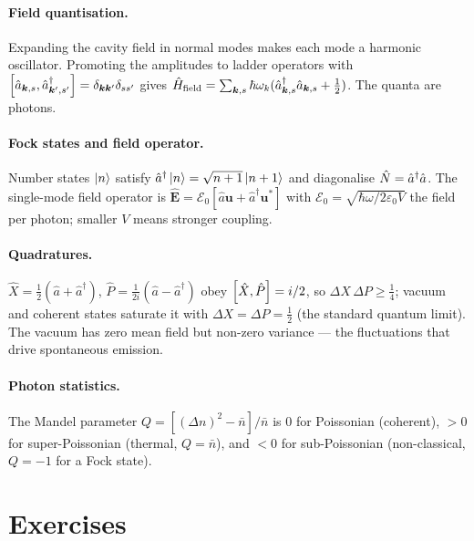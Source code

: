 \clearpage
\begin{chaptersummary}

\paragraph{Field quantisation.}
Expanding the cavity field in normal modes makes each mode a
harmonic oscillator. Promoting the amplitudes to ladder operators
with $\comm{\hat a_{\bm k,s}}{\hat a_{\bm k',s'}^\dagger}=\delta_{\bm k\bm k'}\delta_{ss'}$
gives $\hat{H}_{\rm field}=\sum_{\bm k,s}\hbar\omega_k(\hat a_{\bm k,s}^\dagger\hat a_{\bm k,s}+\tfrac12)$.
The quanta are photons.

\paragraph{Fock states and field operator.}
Number states $\ket n$ satisfy $\hat a^\dagger\ket n=\sqrt{n+1}\ket{n+1}$
and diagonalise $\hat{N}=\hat a^\dagger\hat a$. The single-mode field
operator is $\hat{\bm E}=\mathcal E_0[\hat a\bm u+\hat a^\dagger\bm u^*]$
with $\mathcal E_0=\sqrt{\hbar\omega/2\varepsilon_0 V}$ the field per
photon; smaller $V$ means stronger coupling.

\paragraph{Quadratures.}
$\hat X=\tfrac12(\hat a+\hat a^\dagger)$,
$\hat P=\tfrac1{2i}(\hat a-\hat a^\dagger)$ obey
$\comm{\hat X}{\hat P}=i/2$, so $\Delta X\,\Delta P\geq\tfrac14$;
vacuum and coherent states saturate it with
$\Delta X=\Delta P=\tfrac12$ (the standard quantum limit). The
vacuum has zero mean field but non-zero variance --- the fluctuations
that drive spontaneous emission.

\paragraph{Photon statistics.}
The Mandel parameter $Q=[(\Delta n)^2-\bar n]/\bar n$ is $0$ for
Poissonian (coherent), $>0$ for super-Poissonian (thermal,
$Q=\bar n$), and $<0$ for sub-Poissonian (non-classical, $Q=-1$ for
a Fock state).

\end{chaptersummary}

\section*{Exercises}

